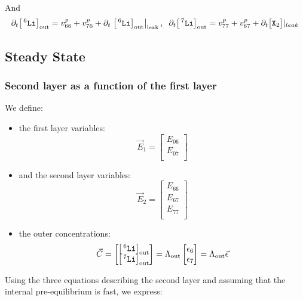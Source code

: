 \documentclass[aps,onecolumn,11pt]{revtex4}
\newcommand{\mychem}[1]{\mathtt{#1}}
\newcommand{\myconc}[1]{\big[#1\big]}
\newcommand{\spx}{\mychem{X}}
\newcommand{\spLi}[1]{{\!~^{#1}\mychem{Li}}}
\newcommand{\Li}[1]{\myconc{\spLi{#1}}}
\newcommand{\myleak}[1]{\left.{#1}\right\vert_{\mathrm{leak}}}
\newcommand{\myout}[1]{{#1}_{\tiny\mathrm{out}}}
\newcommand{\LiOut}[1]{\myout{\Li{#1}}}
\newcommand{\LiAll}{\Lambda}
\newcommand{\LiAllOut}{\myout{\LiAll}}
\begin{document}
And
\begin{equation}
	\partial_t \LiOut{6} = v^p_{66}+v^p_{76} + \partial_t \myleak{\LiOut{6}},\;\;
	\partial_t \LiOut{7} = v^p_{77}+v^p_{67} + \partial_t \myconc{\spx_2}\vert_{leak}
\end{equation}

\subsection{Steady State}


\subsubsection{Second layer as a function of the first layer}

We define:
\begin{itemize}
\item the first layer variables:
\begin{equation}
	\vec{E}_1 = \begin{bmatrix}
	E_{06}\\
	E_{07}\\
	\end{bmatrix}
\end{equation}
\item and the second layer variables:
\begin{equation}
	\vec{E}_2 = \begin{bmatrix}
	E_{66}\\
	E_{67}\\
	E_{77}\\
	\end{bmatrix}
\end{equation}
\item the outer concentrations:
\begin{equation}
	\vec{C} = 
	\begin{bmatrix}
	\LiOut{6}\\
	\LiOut{7}\\
	\end{bmatrix}
	=
	\LiAllOut
	\begin{bmatrix}
	\epsilon_6\\
	\epsilon_7\\
	\end{bmatrix}
	=
	\LiAllOut\vec{\epsilon}
\end{equation}
\end{itemize}

Using the three equations describing the second layer and assuming that the internal pre-equilibrium is fast, we express:
\end{document}
